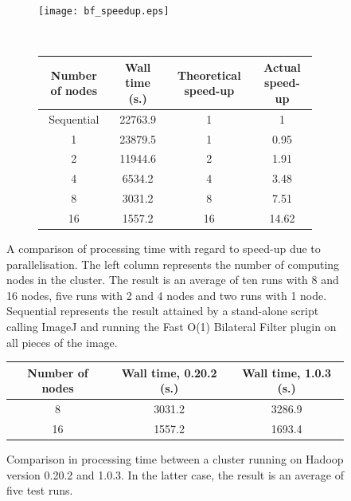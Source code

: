 \documentclass [12pt,a4paper]{report}
\begin{document}
\begin{figure}[h]
\begin{subfigure}{.5\textwidth}
  \centering
  \texttt{[image: bf\_speedup.eps]} %
\end{subfigure}
%
\\
\begin{subfigure}{.5\textwidth}
\begin{center}
	\begin{tabular}{c | c | c | c}
	Number of nodes & Wall time (s.) & Theoretical speed-up & Actual speed-up \\ 
	\hline
	Sequential & 22763.9 & 1 & 1 \\
	1 & 23879.5 & 1 & 0.95 \\
	2 & 11944.6 & 2 & 1.91 \\
	4 & 6534.2 & 4 & 3.48 \\
	8 & 3031.2 & 8 & 7.51 \\
	16 & 1557.2 & 16 & 14.62 \\
	\end{tabular}
\end{center}
\end{subfigure}
\caption{A comparison of processing time with regard to speed-up due to parallelisation. The left column represents the number of computing nodes in the cluster. The result is an average of ten runs with 8 and 16 nodes, five runs with 2 and 4 nodes and two runs with 1 node. Sequential represents the result attained by a stand-alone script calling ImageJ and running the Fast O(1) Bilateral Filter plugin on all pieces of the image.}
\label{bf_speedup}
\end{figure}

\begin{figure}[h]
\begin{center}
\begin{tabular}{c | c | c}
Number of nodes & Wall time, 0.20.2 (s.) & Wall time, 1.0.3 (s.) \\ 
\hline
8 & 3031.2 & 3286.9 \\
16 & 1557.2 & 1693.4 \\
\end{tabular}
\caption{Comparison in processing time between a cluster running on Hadoop version 0.20.2 and 1.0.3. In the latter case, the result is an average of five test runs.}
\label{fig_hadoop_version_compare}
\end{center}
\end{figure}
\end{document}
